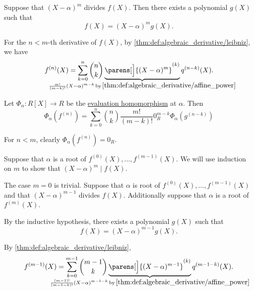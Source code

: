 \begin{defproof}
   Suppose that \( (X - \alpha)^m \) divides \( f(X) \). Then there exists a polynomial \( g(X) \) such that
  \begin{equation*}
    f(X) = (X - \alpha)^m g(X).
  \end{equation*}

  For the \( n < m \)-th derivative of \( f(X) \), by \cref{thm:def:algebraic_derivative/leibniz}, we have
  \begin{equation*}
    f^{(n)}(X) = \sum_{k=0}^n \binom n k \underbrace{\parens[\Big]{ (X - \alpha)^m }^{(k)}}_{\mathclap{\frac {m!} {(m-k)!} (X - \alpha)^{m-k} \T*{by} \ref{thm:def:algebraic_derivative/affine_power}}} q^{(n-k)}(X).
  \end{equation*}

  Let \( \Phi_\alpha: R[X] \to R \) be the \hyperref[con:evaluation_homomorphism]{evaluation homomorphism} at \( \alpha \). Then
  \begin{equation*}
    \Phi_\alpha(f^{(n)}) = \sum_{k=0}^n \binom n k \frac {m!} {(m-k)!} 0_R^{m-k} \Phi_\alpha(g^{(n-k)})
  \end{equation*}

  For \( n < m \), clearly \( \Phi_\alpha(f^{(n)}) = 0_R \).

   Suppose that \( \alpha \) is a root of \( f^{(0)}(X), \ldots, f^{(m-1)}(X) \). We will use induction on \( m \) to show that \( (X - \alpha)^m \mid f(X) \).

  The case \( m = 0 \) is trivial. Suppose that \( \alpha \) is root of \( f^{(0)}(X), \ldots, f^{(m-1)}(X) \) and that \( (X - \alpha)^{m-1} \) divides \( f(X) \). Additionally suppose that \( \alpha \) is a root of \( f^{(m)}(X) \).

  By the inductive hypothesis, there exists a polynomial \( g(X) \) such that
  \begin{equation*}
    f(X) = (X - \alpha)^{m-1} g(X).
  \end{equation*}

  By \cref{thm:def:algebraic_derivative/leibniz},
  \begin{equation*}
    f^{(m-1)}(X) = \sum_{k=0}^{m-1} \binom {m-1} k \underbrace{\parens[\Big]{ (X - \alpha)^{m - 1} }^{(k)}}_{\mathclap{\frac {(m - 1)!} {(m - 1 - k)!} (X - \alpha)^{m - 1 - k} \T*{by} \ref{thm:def:algebraic_derivative/affine_power}}} q^{(m - 1 - k)}(X).
  \end{equation*}


\end{defproof}
